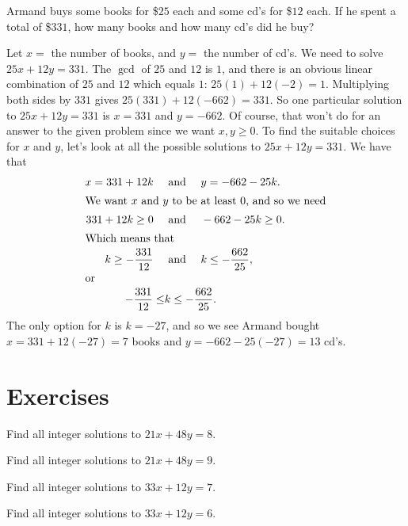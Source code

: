 \begin{exmp}
Armand buys some books for \$$25$ each
 and some cd's
for \$$12$ each. If he spent a total of \$$331$, how many books and how many
cd's did he buy?

Let $x=$ the number of books, and $y=$ the number of cd's.
We need to solve $25x+12y = 331$.
The $\gcd$ of $25$ and $12$ is $1$, and there is an obvious linear
combination of $25$ and $12$ which equals $1$:  $25(1) + 12(-2) = 1$.
Multiplying both sides by $331$ gives $25(331) +12(-662)= 331$.
So one particular solution to $25x+12y = 331$ is $x=331$ and
$y=-662$. Of course, that won't do for an answer to the given problem
since we want $x,y\geq 0$. To find the suitable choices for $x$ and $y$,
let's look at all the possible solutions to $25x+12y = 331$. We have that
\begin{align*}
x = 331 + 12k \quad&\text{ and }\quad y = -662-25k. \\
\intertext{We want $x$ and $y$ to be at least $0$, and so we need}
331+12k\geq 0 \quad&\text{ and }\quad -662-25k\geq 0. \\
\intertext{Which means that}
k \geq -{\frac{331}{12}} \quad&\text{ and }\quad k\leq-{\frac{662}{25}}, \\
\intertext{or}
 -{\frac{331}{12}}\leq &k\leq-{\frac{662}{25}}. \\
\end{align*}
The only option for $k$ is $k=-27$, and so we see Armand
bought $x = 331+12(-27) = 7$ books and $y = -662-25(-27) = 13$
cd's.
\end{exmp}


\clearpage

\section{Exercises}
\begin{exer}
Find all integer solutions to $21x+48y =8$.
\end{exer}

\begin{exer}
Find all integer solutions to $21x+48y =9$.
\end{exer}

\begin{exer}
 Find all integer solutions to $33x+12y =7$.
\end{exer}

\begin{exer}
Find all integer solutions to $33x+12y =6$.
\end{exer}

